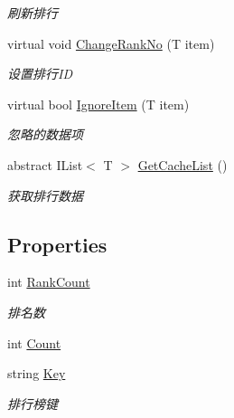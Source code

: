 \begin{DoxyCompactItemize}
\begin{DoxyCompactList}\small\item\em 刷新排行 \end{DoxyCompactList}\item 
virtual void \mbox{\hyperlink{class_t_net_1_1_com_1_1_rank_1_1_ranking_a39db6cc97d4eccc287831119a5d24359}{Change\+Rank\+No}} (T item)
\begin{DoxyCompactList}\small\item\em 设置排行\+ID \end{DoxyCompactList}\item 
virtual bool \mbox{\hyperlink{class_t_net_1_1_com_1_1_rank_1_1_ranking_a6412dd1b302d90a6c982228bf1235c7f}{Ignore\+Item}} (T item)
\begin{DoxyCompactList}\small\item\em 忽略的数据项 \end{DoxyCompactList}\item 
abstract I\+List$<$ T $>$ \mbox{\hyperlink{class_t_net_1_1_com_1_1_rank_1_1_ranking_ae0000a540fbbf11d5ca86eeff68423f3}{Get\+Cache\+List}} ()
\begin{DoxyCompactList}\small\item\em 获取排行数据 \end{DoxyCompactList}\end{DoxyCompactItemize}
\subsection*{Properties}
\begin{DoxyCompactItemize}
\item 
int \mbox{\hyperlink{class_t_net_1_1_com_1_1_rank_1_1_ranking_a2707e2072a0dc2cfe75135da1d8ad921}{Rank\+Count}}
\begin{DoxyCompactList}\small\item\em 排名数 \end{DoxyCompactList}\item 
int \mbox{\hyperlink{class_t_net_1_1_com_1_1_rank_1_1_ranking_af43d1404d153d185cdd4329ea511c31f}{Count}}
\item 
string \mbox{\hyperlink{class_t_net_1_1_com_1_1_rank_1_1_ranking_a6e4dde8ff8f596a60ed9efb7a058079d}{Key}}
\begin{DoxyCompactList}\small\item\em 排行榜键 \end{DoxyCompactList}\end{DoxyCompactItemize}


